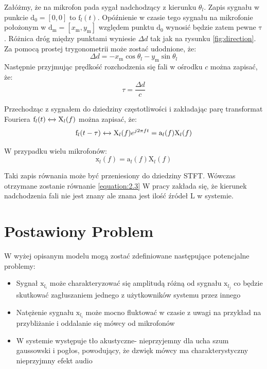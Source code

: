 \noindent Załóżmy, że na mikrofon pada sygał nadchodzący z kierunku $\theta_{l}$.
Zapis sygnału w punkcie $\bm{\mathrm{d}}_{0} = [0,0]$ to $\mathrm{f}_{l}(t)$. 
Opóźnienie w czasie tego sygnału na mikrofonie położonym w $\bm{\mathrm{d}}_{\mathrm{m}} = [x_{\mathrm{m}},y_{\mathrm{m}}]$ względem punktu $\bm{\mathrm{d}}_{0}$ wynosić będzie zatem pewne $\mathrm{\tau}$. Różnica dróg między punktami wyniesie $\Delta d$ tak jak na rysunku \ref{fig:direction}. Za pomocą prostej trygonometrii może zostać udodnione, że:
\begin{equation}
    \label{equation:2.4}
    \Delta d = -x_{\mathrm{m}}\cos{\theta_{l}} - y_{\mathrm{m}}\sin{\theta_{l}}
\end{equation}
Następnie przyjmując prędkość rozchodzenia się fali w ośrodku $c$ można zapisać, że:
\begin{equation}
    \label{equation:2.5}
    \tau = \dfrac{\Delta d}{c}
\end{equation}

\noindent Przechodząc z sygnałem do dziedziny częstotliwości i zakładając parę transformat Fouriera $\mathrm{f}_{l}(t)\xleftrightarrow{}\mathrm{X}_{l}(f)$ można zapisać, że:
\begin{equation}
    \label{equation:2.6}
    \mathrm{f}_{l}(t-\tau) \xleftrightarrow{} \mathrm{X}_{l}(f)e^{j 2 \pi f t} =
    \mathrm{a}_{l}(f) \mathrm{X}_{l}(f) 
\end{equation}

\noindent W przypadku wielu mikrofonów:
\begin{equation}
    \label{equation:2.7}
    \bm{\mathrm{x}}_l(f)=
    \bm{\mathrm{a}}_l(f)\mathrm{X}_{l}(f)
\end{equation}


\noindent Taki zapis równania może być przeniesiony do dziedziny STFT. Wówczas otrzymane zostanie równanie \ref{equation:2.3}
\noindent W pracy zakłada się, że kierunek nadchodzenia fali nie jest znany ale znana jest ilość źródeł L w systemie.


\newpage
\section{Postawiony Problem}

W wyżej opisanym modelu mogą zostać zdefiniowane następujące potencjalne problemy:
\begin{itemize}
    \item Sygnał $\bm{\mathrm{x}}_{l_{i}}$ może charakteryzować się amplitudą różną od sygnału $\bm{\mathrm{x}}_{l_{j}}$ co będzie skutkować zagłuszaniem jednego z użytkowników systemu przez innego 
    \item Natężenie sygnału $\bm{\mathrm{x}}_{l_{i}}$ może mocno fluktować w czasie z uwagi na przykład na przybliżanie i oddalanie się mówcy od mikrofonów
    \item W systemie występuje tło akustyczne- nieprzyjemny dla ucha szum gaussowski i pogłos, powodujący, że dzwięk mówcy ma charakterystyczny nieprzyjmny efekt audio
\end{itemize}

